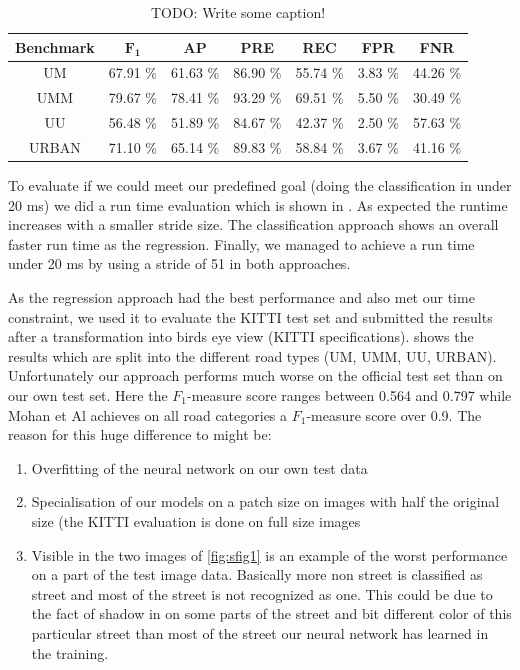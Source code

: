  \begin{table}[]
 	\begin{center}
 		\begin{tabular}{c|cccccc}
 			{\bf Benchmark} & {\bf $\mathbf{F_1}$} & {\bf AP} & {\bf PRE} & {\bf REC} & {\bf FPR} & {\bf FNR}\\ \hline
 			UM & 67.91 \% & 61.63 \% & 86.90 \% & 55.74 \% & 3.83 \% & 44.26 \%\\
 			UMM & 79.67 \% & 78.41 \% & 93.29 \% & 69.51 \% & 5.50 \% & 30.49 \%\\
 			UU  & 56.48 \% & 51.89 \% & 84.67 \% & 42.37 \% & 2.50 \% & 57.63 \%\\
 			URBAN & 71.10 \% & 65.14 \% & 89.83 \% & 58.84 \% & 3.67 \% & 41.16 \%\\
 		\end{tabular}
 	\end{center}
 	 		\caption{TODO: Write some caption!}
 	 		\label{tab:kitti}
 \end{table}







To evaluate if we could meet our predefined goal (doing the classification in under 20 ms) we did a run time evaluation which is shown in . As expected the runtime increases with a smaller stride size. The classification approach shows an overall faster run time as the regression. Finally, we managed to achieve a run time under 20 ms by using a stride of 51 in both approaches.





As the regression approach had the best performance and also met our time constraint, we used it to evaluate the KITTI test set and submitted the results after a transformation into birds eye view (KITTI specifications). shows the results which are split into the different road types (UM, UMM, UU, URBAN).
Unfortunately our approach performs much worse on the official test set than on our own test set. Here the $F_1$-measure score ranges between 0.564 and 0.797 while Mohan et Al achieves on all road categories a $F_1$-measure score over 0.9. The reason for this huge difference to might be: \\

\begin{enumerate}
  \item Overfitting of the neural network on our own test data
  \item Specialisation of our models on a patch size on images with half the original size (the KITTI evaluation is done on full size images
  \item Visible in the two images of \cref{fig:sfig1} is an example of the worst performance on a part of the test image data. Basically more non street is classified as street and most of the street is not recognized as one. This could be due to the fact of shadow in on some parts of the street and bit different color of this particular street than most of the street our neural network has learned in the training.
  \end{enumerate}

